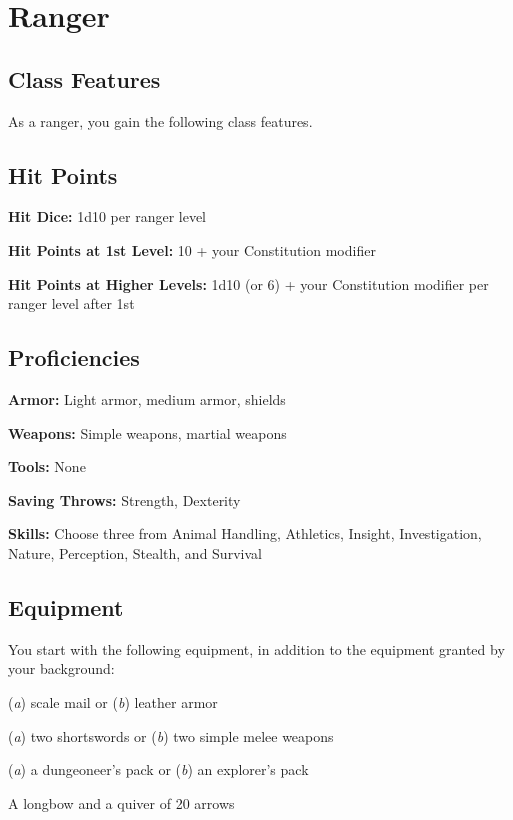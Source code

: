 \section{Ranger}

\subsection{Class Features}

As a ranger, you gain the following class features.

\subsection{Hit Points}

\textbf{Hit Dice:} 1d10 per ranger level

\textbf{Hit Points at 1st Level:} 10 + your Constitution modifier

\textbf{Hit Points at Higher Levels:} 1d10 (or 6) + your Constitution modifier per ranger level after 1st

\subsection{Proficiencies}

\textbf{Armor:} Light armor, medium armor, shields

\textbf{Weapons:} Simple weapons, martial weapons

\textbf{Tools:} None

\textbf{Saving Throws:} Strength, Dexterity

\textbf{Skills:} Choose three from Animal Handling, Athletics, Insight, Investigation, Nature, Perception, Stealth, and Survival

\subsection{Equipment}

You start with the following equipment, in addition to the equipment granted by your background:
\item (\textit{a}) scale mail or (\textit{b}) leather armor
\item (\textit{a}) two shortswords or (\textit{b}) two simple melee weapons
\item (\textit{a}) a dungeoneer’s pack or (\textit{b}) an explorer’s pack
\item A longbow and a quiver of 20 arrows

